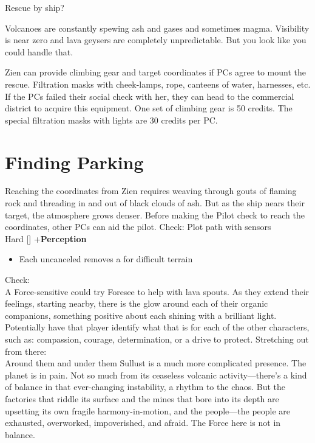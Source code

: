 \documentclass{book}
\newcommand{\df}{\difficulty}
\begin{document}
\begin{multicols}{2}
Rescue by ship? \\
\begin{quoting}
Volcanoes are constantly spewing ash and gases and sometimes magma. Visibility is near zero and lava geysers are completely unpredictable.  But you look like you could handle that.
\end{quoting}

Zien can provide climbing gear and target coordinates if PCs agree to mount the rescue. Filtration masks with cheek-lamps, rope, canteens of water, harnesses, etc. If the PCs failed their social check with her, they can head to the commercial district to acquire this equipment. One set of climbing gear is 50 credits. The special filtration masks with lights are 30 credits per PC.


\section{Finding Parking}

Reaching the coordinates from Zien requires weaving through gouts of flaming rock and threading in and out of black clouds of ash. But as the ship nears their target, the atmosphere grows denser. Before making the Pilot check to reach the coordinates, other PCs can aid the pilot.
Check: Plot path with sensors\\
Hard [\df\df\df] +\setback  \textbf{Perception}
\begin{itemize}
\item \success Each uncanceled \success removes a \setback for difficult terrain
\end{itemize}
Check:\\
A Force-sensitive could try Foresee to help with lava spouts. As they extend their feelings, starting nearby, there is the glow around each of their organic companions, something positive about each shining with a brilliant light. Potentially have that player identify what that is for each of the other characters, such as: compassion, courage, determination, or a drive to protect.
Stretching out from there: \\
Around them and under them Sullust is a much more complicated presence. The planet is in pain. Not so much from its ceaseless volcanic activity—there’s a kind of balance in that ever-changing instability, a rhythm to the chaos. But the factories that riddle its surface and the mines that bore into its depth are upsetting its own fragile harmony-in-motion, and the people—the people are exhausted, overworked, impoverished, and afraid. The Force here is not in balance.


\end{multicols}
\end{document}
